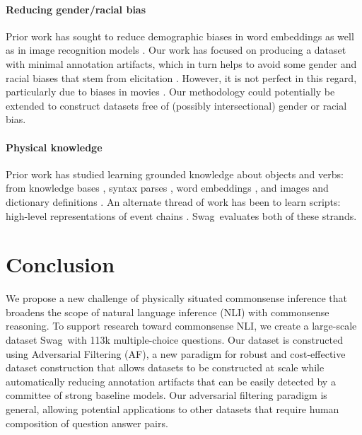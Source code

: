 \documentclass[11pt,a4paper]{article}
\newcommand\customfont[1]{{\usefont{T1}{perm}{m}{n}#1}}
\newcommand{\datasetname}{{\small\customfont{Swag}}}
\begin{document}
\paragraph{Reducing gender/racial bias} Prior work has sought to reduce demographic biases in word embeddings \cite{zhang2018mitigating} as well as in image recognition models \cite{zhao2017men}. Our work has focused on producing a dataset with minimal annotation artifacts, which in turn helps to avoid some gender and racial biases that stem from elicitation \cite{rudinger2017social}. However, it is not perfect in this regard, particularly due to biases in movies \cite{schofield2016gender, sap2017connotation}. Our methodology could potentially be extended to construct datasets free of (possibly intersectional) gender or racial bias. 

\paragraph{Physical knowledge} Prior work has studied learning grounded knowledge about objects and verbs: from knowledge bases \cite{li_commonsense_2016}, syntax parses \cite{forbes2017verb}, word embeddings \cite{lucy2017distributional}, and images and dictionary definitions \cite{emnlp17_zellers}. An alternate thread of work has been to learn scripts: high-level representations of event chains \cite{Schank1975,chambers_unsupervised_2009}. \datasetname~evaluates both of these strands.
 
\section{Conclusion}
We propose a new challenge of physically situated commonsense inference that broadens the scope of natural language inference (NLI) with commonsense reasoning. To support research toward commonsense NLI, we create a large-scale dataset \datasetname\  with 113k multiple-choice questions. Our dataset is constructed using Adversarial Filtering (AF), a new paradigm for robust and cost-effective dataset construction that allows datasets to be constructed at scale while automatically reducing annotation artifacts that can be easily detected by a committee of strong baseline models. Our adversarial filtering paradigm is general, allowing potential applications to other datasets that require human composition of question answer pairs. 


 
\end{document}
